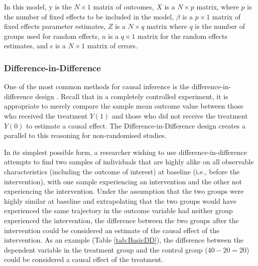 \documentclass[12pt]{article}
\begin{document}
In this model, y is the $N \times 1$ matrix of outcomes, $X$ is a $N \times p$ matrix, where $p$ is the number of fixed effects to be included in the model, $\beta$ is a $p \times 1$ matrix of fixed effects parameter estimates, $Z$ is a $N \times q$ matrix where $q$ is the number of groups used for random effects, $u$ is a $q \times 1$ matrix for the random effects estimates, and $\epsilon$ is a $N \times 1$ matrix of errors.

\subsubsection{Difference-in-Difference}

One of the most common methods for causal inference is the difference-in-difference design \citep{lechnerEstimationCausalEffects2010}. Recall that in a completely controlled experiment, it is appropriate to merely compare the sample mean outcome value between those who received the treatment $Y(1)$ and those who did not receive the treatment $Y(0)$ to estimate a causal effect. The Difference-in-Difference design creates a parallel to this reasoning for non-randomised studies.

In its simplest possible form, a researcher wishing to use difference-in-difference attempts to find two samples of individuals that are highly alike on all observable characteristics (including the outcome of interest) at baseline (i.e., before the intervention), with one sample experiencing an intervention and the other not experiencing the intervention. Under the assumption that the two groups were highly similar at baseline and extrapolating that the two groups would have experienced the same trajectory in the outcome variable had neither group experienced the intervention, the difference between the two groups after the intervention could be considered an estimate of the causal effect of the intervention. As an example (Table \ref{tab:BasicDD}), the difference between the dependent variable in the treatment group and the control group ($40-20 = 20$) could be considered a causal effect of the treatment.
\end{document}
